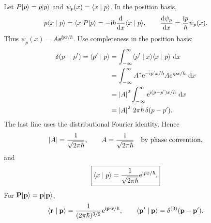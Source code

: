 Let $P\lvert p\rangle=p\lvert p\rangle$ and $\psi_p(x)=\langle x\mid p\rangle$. In the position basis,
\[
 p\langle x\mid p\rangle=\langle x\rvert P\lvert p\rangle
 =-\mathrm{i}\hbar\frac{\mathop{}\!\mathrm{d}}{\mathop{}\!\mathrm{d} x}\langle x\mid p\rangle,
 \qquad \frac{\mathop{}\!\mathrm{d}\psi_p}{\mathop{}\!\mathrm{d} x}=\frac{\mathrm{i} p}{\hbar}\psi_p(x).
\]
Thus $\psi_p(x)=A\ee^{\ii px/\hbar}$.
Use completeness in the position basis:
\begin{align*}
 \delta(p-p')=\langle p'\mid p\rangle
 &=\int_{-\infty}^{\infty}\langle p'\mid x\rangle\langle x\mid p\rangle\,\mathop{}\!\mathrm{d} x\\
 &=\int_{-\infty}^{\infty}
 A^*\mathrm{e}^{-\mathrm{i} p'x/\hbar}A\mathrm{e}^{\mathrm{i} px/\hbar}\,\mathop{}\!\mathrm{d} x\\
 &=\left\lvert A\right\rvert^2\int_{-\infty}^{\infty}\mathrm{e}^{\mathrm{i}(p-p')x/\hbar}\,\mathop{}\!\mathrm{d} x\\
 &=\left\lvert A\right\rvert^2\,2\pi\hbar\,\delta(p-p').
\end{align*}
The last line uses the distributional Fourier identity. Hence
\[
 \left\lvert A\right\rvert=\frac1{\sqrt{2\pi\hbar}},\qquad
 A=\frac1{\sqrt{2\pi\hbar}}\quad\hbox{by phase convention},
\]
and
\[
 \boxed{\langle x\mid p\rangle=\frac1{\sqrt{2\pi\hbar}}\mathrm{e}^{\mathrm{i} px/\hbar}.}
\]
For $\mathbf P\lvert \mathbf p\rangle=\mathbf p\lvert \mathbf p\rangle$,
\[
 \langle \mathbf r\mid \mathbf p\rangle
 =\frac1{(2\pi\hbar)^{3/2}}\mathrm{e}^{\mathrm{i}\mathbf p\cdot\mathbf r/\hbar},
 \qquad \langle \mathbf p'\mid \mathbf p\rangle=\delta^{(3)}(\mathbf p-\mathbf p').
\]
